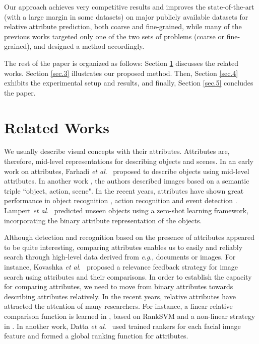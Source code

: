 \documentclass[runningheads]{llncs}
\newcommand{\etal}{\textit{et al}.}
\newcommand{\eg}{\textit{e}.\textit{g}.}
\begin{document}
Our approach achieves very competitive results and improves the state-of-the-art (with a large margin in some datasets) on major publicly available datasets for relative attribute prediction, both coarse and fine-grained, while many of the previous works targeted only one of the two sets of problems (coarse or fine-grained), and designed a method accordingly.

The rest of the paper is organized as follows: Section \ref{sec.2} discusses the related works. Section \ref{sec.3} illustrates our proposed method. Then, Section \ref{sec.4} exhibits the experimental setup and results, and finally, Section \ref{sec.5} concludes the paper.


\section{Related Works}
\label{sec.2}

We usually describe visual concepts with their attributes. %
Attributes are, therefore, mid-level representations for describing objects and scenes. In an early work on attributes, Farhadi \etal~\cite{Farhadi09describingobjects} proposed to describe objects using mid-level attributes. In another work \cite{Farhadi2010EveryPT}, the authors described images based on %
a semantic triple ``object, action, scene". In the recent years, attributes have shown great performance in object recognition \cite{Farhadi09describingobjects,7298613}, action recognition \cite{6838985,5995353} and event detection \cite{6475038}. Lampert \etal~\cite{6571196} predicted unseen objects using a zero-shot learning framework, incorporating the binary attribute representation of the objects. %

Although detection and recognition based on the presence of attributes appeared to be quite interesting, comparing attributes enables us to easily and reliably search through high-level data derived from \eg, documents or images. For instance, Kovashka \etal~\cite{KovashkaG13} proposed a relevance feedback strategy for image search using attributes and their comparisons. In order to establish the capacity for comparing attributes, we need to move from binary attributes towards describing attributes relatively. In the recent years, relative attributes have attracted the attention of many researchers.
For instance, a linear relative comparison function is learned in \cite{parikh2011}, based on RankSVM \cite{Joachims2002} and a non-linear strategy in \cite{Li2012RelativeFF}. In another work, Datta \etal~\cite{5771429} used trained rankers for each facial image feature and formed a global ranking function for attributes.
\end{document}
